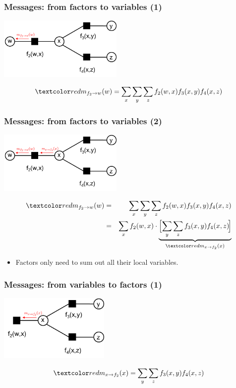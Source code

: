 \begin{frame}
\frametitle{Messages: from factors to variables (1)}

\centerline{\includegraphics[width=0.45\textwidth]{ExampleMessages1}
}
\[
\Red{m_{f_2\rightarrow w}(w)} = \sum_x\sum_y\sum_z f_2(w,x)f_3(x,y)f_4(x,z)
\]

\phantom{.}
\hfill
\phantom{.}

\end{frame}


\begin{frame}
\frametitle{Messages: from factors to variables (2)}

\centerline{\includegraphics[width=0.45\textwidth]{ExampleMessages2}
}
\begin{eqnarray*}
\Red{m_{f_2\rightarrow w}(w)} &=& \sum_x\sum_y\sum_z
f_2(w,x)f_3(x,y)f_4(x,z) \\
&=& 
\sum_x f_2(w,x) \cdot
\underbrace{\Big[\!\sum_y\sum_z f_3(x,y)f_4(x,z)\!\Big]}_{
\Red{m_{x\rightarrow f_2}(x)}}
\end{eqnarray*}

\begin{itemize}
\item Factors only need to sum out all their local variables.
\end{itemize}

\hfill

\end{frame}


\begin{frame}
\frametitle{Messages: from variables to factors (1)}

\centerline{\includegraphics[width=0.4\textwidth]{ExampleMessages3}
}
\[
\Red{m_{x\rightarrow f_2}(x)} = \sum_y\sum_z f_3(x,y)f_4(x,z)
\]

\phantom{.}
\hfill
\phantom{.}

\end{frame}



